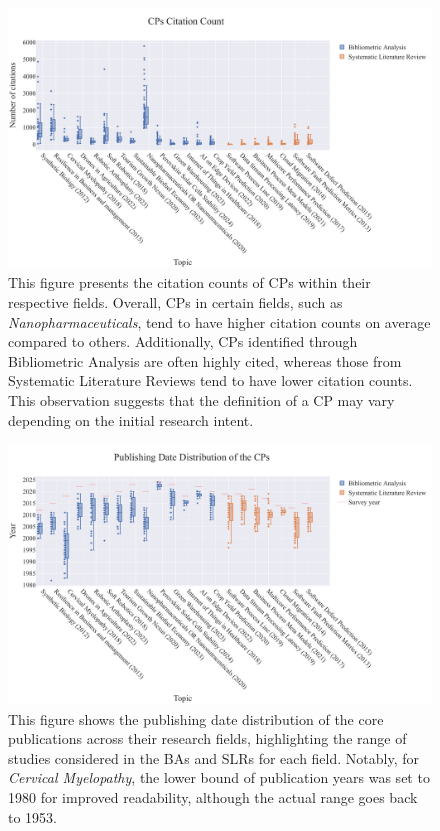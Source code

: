 \documentclass[%
  a4paper,fontsize=11pt,abstract=on,%
  oneside,BCOR=19mm,%
]{scrreprt}
\begin{document}
\begin{figure}[!h]
	\centering	
	\includegraphics[scale=0.45]{pics/citation-distribution.pdf}
	\caption[CPs Citation Count in Their Respective Fields]{This figure presents the citation counts of CPs within their respective fields. Overall, CPs in certain fields, such as \textit{Nanopharmaceuticals}, tend to have higher citation counts on average compared to others. Additionally, CPs identified through Bibliometric Analysis are often highly cited, whereas those from Systematic Literature Reviews tend to have lower citation counts. This observation suggests that the definition of a CP may vary depending on the initial research intent.}

	\label{fig:dataset-citation}
\end{figure}

\begin{figure}
	\centering	
	\includegraphics[scale=0.45]{pics/year-distribution.pdf}
	\caption[Distribution of publication years per topic]{This figure shows the publishing date distribution of the core publications across their research fields, highlighting the range of studies considered in the BAs and SLRs for each field. Notably, for \textit{Cervical Myelopathy}, the lower bound of publication years was set to 1980 for improved readability, although the actual range goes back to 1953.}
	\label{fig:dataset-years}
\end{figure}
\end{document}
